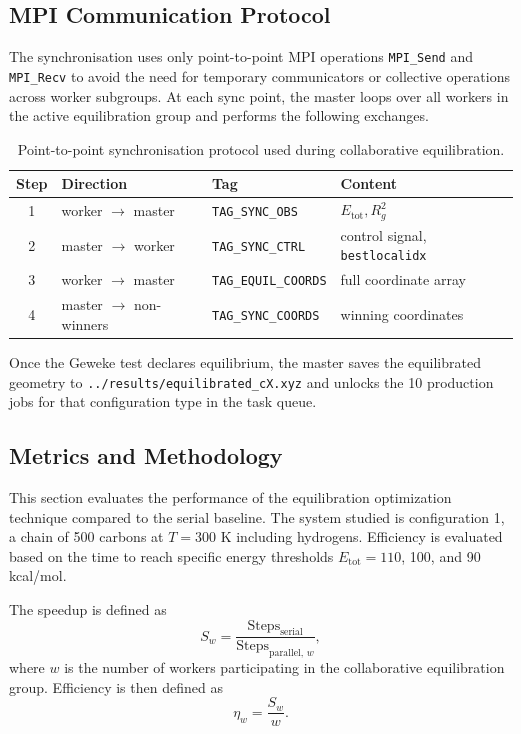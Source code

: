 \subsection{MPI Communication Protocol}

The synchronisation uses only point-to-point MPI operations
\texttt{MPI\_Send} and \texttt{MPI\_Recv} to avoid the need for
temporary communicators or collective operations across worker
subgroups. At each sync point, the master loops over all workers in the
active equilibration group and performs the following exchanges.

\begin{table}[h!]
\centering
\begin{tabular}{clll}
\toprule
Step & Direction & Tag & Content \\
\midrule
1 & worker \(\rightarrow\) master & \texttt{TAG\_SYNC\_OBS} &
\(E_{\mathrm{tot}}, R_g^2\) \\
2 & master \(\rightarrow\) worker & \texttt{TAG\_SYNC\_CTRL} &
control signal, \texttt{bestlocalidx} \\
3 & worker \(\rightarrow\) master & \texttt{TAG\_EQUIL\_COORDS} &
full coordinate array \\
4 & master \(\rightarrow\) non-winners & \texttt{TAG\_SYNC\_COORDS} &
winning coordinates \\
\bottomrule
\end{tabular}
\caption{Point-to-point synchronisation protocol used during collaborative equilibration.}
\end{table}

Once the Geweke test declares equilibrium, the master saves the
equilibrated geometry to \texttt{../results/equilibrated\_cX.xyz} and
unlocks the 10 production jobs for that configuration type in the task
queue.

\subsection{Metrics and Methodology}

This section evaluates the performance of the equilibration
optimization technique compared to the serial baseline. The system
studied is configuration 1, a chain of 500 carbons at \(T = 300\) K
including hydrogens. Efficiency is evaluated based on the time to reach
specific energy thresholds \(E_{\mathrm{tot}} = 110\), 100, and
90 kcal/mol.

The speedup is defined as
\[
S_w = \frac{\mathrm{Steps}_{\mathrm{serial}}}
           {\mathrm{Steps}_{\mathrm{parallel},\,w}},
\]
where \(w\) is the number of workers participating in the collaborative
equilibration group. Efficiency is then defined as
\[
\eta_w = \frac{S_w}{w}.
\]

